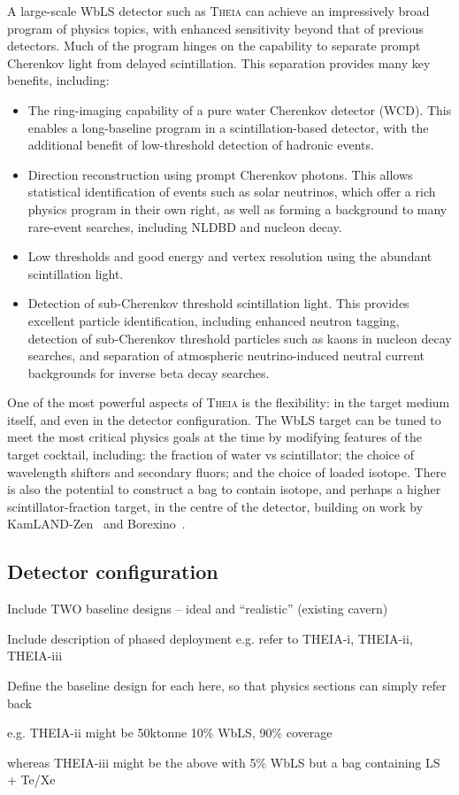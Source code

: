 A large-scale WbLS detector such as \textsc{Theia} can achieve an impressively broad program of physics topics, with enhanced sensitivity beyond that of previous detectors.  Much of the program hinges on the capability to separate prompt Cherenkov light from delayed scintillation.  This separation provides many key benefits, including:
\begin{itemize}
\item The ring-imaging capability of a pure water Cherenkov detector (WCD).  This enables a long-baseline program in a scintillation-based detector, with the additional benefit of low-threshold detection of hadronic events.

\item  Direction reconstruction using prompt Cherenkov photons.   This allows statistical identification of events such as solar neutrinos, which offer a rich physics program in their own right, as well as forming a background to many rare-event searches, including NLDBD and nucleon decay.

\item Low thresholds and good energy and vertex resolution using the abundant scintillation light.

\item Detection of sub-Cherenkov threshold scintillation light.  This provides excellent particle identification, including enhanced neutron tagging, detection of sub-Cherenkov threshold particles such as kaons in nucleon decay searches, and separation of atmospheric neutrino-induced neutral current backgrounds for inverse beta decay searches.

\end{itemize}

One of the most powerful aspects of \textsc{Theia} is the flexibility:  in the target medium itself, and even in the detector configuration.  The WbLS target can be tuned to meet the most critical physics goals at the time by modifying features of the target cocktail, including: the fraction of water vs scintillator; the choice of wavelength shifters and secondary fluors; and the choice of loaded isotope.  There is also the potential to construct a bag to contain isotope, and perhaps a higher scintillator-fraction target, in the centre of the detector, building on work by KamLAND-Zen~\cite{klz} and Borexino~\cite{bor}.  


\subsection{Detector configuration}
Include TWO baseline designs -- ideal and ``realistic'' (existing cavern)

Include description of phased deployment
e.g. refer to THEIA-i, THEIA-ii, THEIA-iii

Define the baseline design for each here, so that physics sections can simply refer back

e.g. THEIA-ii might be 50ktonne 10\% WbLS, 90\% coverage

whereas THEIA-iii might be the above with 5\% WbLS but a bag containing LS + Te/Xe
